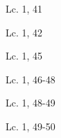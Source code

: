 \documentclass[a4paper,11pt,sans]{article}
\begin{document}
      \begin{multicols}{2}

      \columnbreak
          
      \end{multicols}
      \begin{center}
        Lc. 1, 41        
      \end{center}
      
      \begin{multicols}{2}

      \columnbreak
          
      \end{multicols}
      \begin{center}
        Lc. 1, 42         
      \end{center}
      
      \begin{multicols}{2}

      \columnbreak
          
      \end{multicols}
      \begin{center}
        Lc. 1, 45         
      \end{center}
      
      \begin{multicols}{2}

      \columnbreak
          
      \end{multicols}
      \begin{center}
        Lc. 1, 46-48        
      \end{center}

      \begin{multicols}{2}

      \columnbreak
          
      \end{multicols}
      \begin{center}
        Lc. 1, 48-49          
      \end{center}
      
      \begin{multicols}{2}

      \columnbreak
          
      \end{multicols}
      \begin{center}
        Lc. 1, 49-50          
      \end{center}
      
\end{document}
